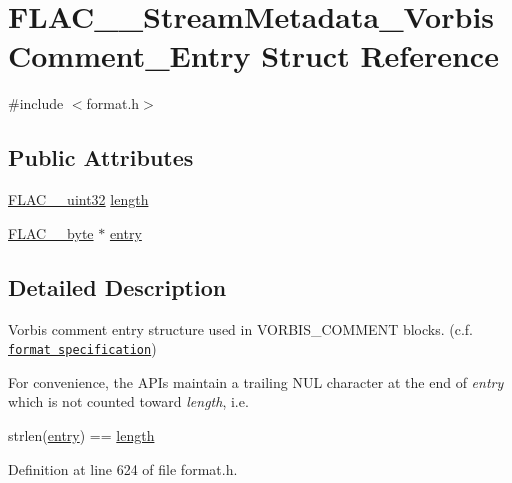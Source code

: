 \hypertarget{struct_f_l_a_c_____stream_metadata___vorbis_comment___entry}{}\section{F\+L\+A\+C\+\_\+\+\_\+\+Stream\+Metadata\+\_\+\+Vorbis\+Comment\+\_\+\+Entry Struct Reference}
\label{struct_f_l_a_c_____stream_metadata___vorbis_comment___entry}


{\ttfamily \#include $<$format.\+h$>$}

\subsection*{Public Attributes}
\begin{DoxyCompactItemize}
\item 
\hyperlink{ordinals_8h_a9c4005ea7ef8d564b0cc993cdd0e4e5e}{F\+L\+A\+C\+\_\+\+\_\+uint32} \hyperlink{struct_f_l_a_c_____stream_metadata___vorbis_comment___entry_aa375f16819aaa4f7e08d8009167cb19e}{length}
\item 
\hyperlink{ordinals_8h_a5eb569b12d5b047cdacada4d57924ee3}{F\+L\+A\+C\+\_\+\+\_\+byte} $\ast$ \hyperlink{struct_f_l_a_c_____stream_metadata___vorbis_comment___entry_a78944f78822b92e7a4e5f15f118f6132}{entry}
\end{DoxyCompactItemize}


\subsection{Detailed Description}
Vorbis comment entry structure used in V\+O\+R\+B\+I\+S\+\_\+\+C\+O\+M\+M\+E\+NT blocks. (c.\+f. \href{../format.html#metadata_block_vorbis_comment}{\tt format specification})

For convenience, the A\+P\+Is maintain a trailing N\+UL character at the end of {\itshape entry} which is not counted toward {\itshape length}, i.\+e. 
\begin{DoxyCode}
strlen(\hyperlink{struct_f_l_a_c_____stream_metadata___vorbis_comment___entry_a78944f78822b92e7a4e5f15f118f6132}{entry}) == \hyperlink{struct_f_l_a_c_____stream_metadata___vorbis_comment___entry_aa375f16819aaa4f7e08d8009167cb19e}{length} 
\end{DoxyCode}
 

Definition at line 624 of file format.\+h.



